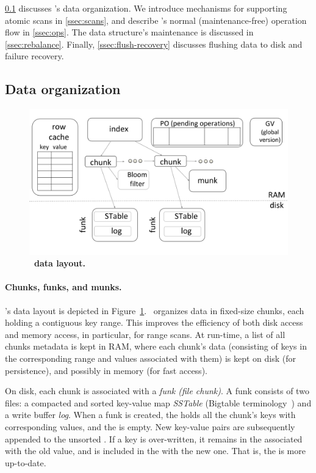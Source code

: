 
\cref{ssec:layout}  discusses \sys's data organization. 
We introduce mechanisms for supporting 
atomic scans  in \cref{ssec:scans}, and describe \sys's
 normal (maintenance-free) operation flow  in \cref{ssec:ops}.  
The data structure's maintenance is discussed in \cref{ssec:rebalance}.
Finally, \cref{ssec:flush-recovery} discusses flushing data to disk and failure recovery.


\subsection{Data organization}
\label{ssec:layout}

\begin{figure}[tb]
\centerline{
\includegraphics[width=\columnwidth]{PiWi.png}
}
\caption{\bf{\sys\ data layout.}}
\label{fig:layout}
\end{figure}

\paragraph{Chunks, funks, and munks.}

\sys's data layout is depicted in Figure~\ref{fig:layout}.
\sys\ organizes data in fixed-size chunks, each holding a contiguous key range.
This improves the efficiency of both disk access and memory access, in particular, for  range scans. 
At run-time, a list of all chunks metadata is kept in RAM, where each chunk's data 
(consisting of keys in the corresponding range and values associated with them) 
is kept on disk (for persistence), and possibly in memory (for fast access). 

On disk, each chunk is associated with a  \emph{funk (file chunk)}.%
A funk consists of two files:  a compacted and sorted  key-value map \emph{SSTable} (Bigtable terminology~\cite{Bigtable2008}) 
and a write buffer \emph{log}. When a funk is created, the  holds all the chunk's keys with corresponding values, and the   is empty.
New key-value pairs are subsequently appended to the unsorted . If a key is over-written, it remains in the  associated with the old value, and is included in the  with the new one.
That is, the  is more up-to-date.

